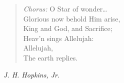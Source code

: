 \begin{verse}
\textit{Chorus:} O Star of wonder\ldots\\[0.7em]

Glorious now behold Him arise,\\
King and God, and Sacrifice;\\
\hspace*{2em}Heav'n sings Allelujah:\\
\hspace*{2em}Allelujah,\\
The earth replies.%
\end{verse}

\vspace{0.5\baselineskip}
\noindent\textit{J. H. Hopkins, Jr.}

\newpage
